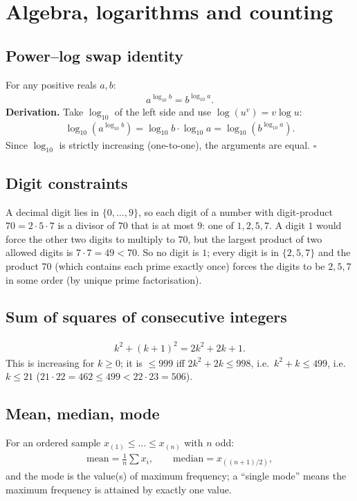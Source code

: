 

\section{Algebra, logarithms and counting}

\subsection{Power--log swap identity}
For any positive reals $a,b$:
\begin{align}
a^{\log_{10}b}=b^{\log_{10}a}. \label{eq:powlog}
\end{align}
\textbf{Derivation.} Take $\log_{10}$ of the left side and use $\log(u^v)=v\log u$:
\begin{align}
\log_{10}\!\left(a^{\log_{10}b}\right)=\log_{10}b\cdot\log_{10}a=\log_{10}\!\left(b^{\log_{10}a}\right).
\end{align}
Since $\log_{10}$ is strictly increasing (one-to-one), the arguments are equal. \hfill$\square$

\subsection{Digit constraints}
A decimal digit lies in $\{0,\dots,9\}$, so each digit of a number with digit-product $70=2\cdot5\cdot7$ is a divisor of $70$
that is at most $9$: one of $1,2,5,7$. A digit $1$ would force the other two digits to multiply to $70$, but the
largest product of two allowed digits is $7\cdot7=49<70$. So no digit is $1$; every digit is in $\{2,5,7\}$ and the
product $70$ (which contains each prime exactly once) forces the digits to be $2,5,7$ in some order
(by unique prime factorisation).

\subsection{Sum of squares of consecutive integers}
\begin{align}
k^2+(k+1)^2=2k^2+2k+1. \label{eq:consecsq}
\end{align}
This is increasing for $k\ge0$; it is $\le999$ iff $2k^2+2k\le998$, i.e.\ $k^2+k\le499$, i.e.\ $k\le21$
($21\cdot22=462\le499<22\cdot23=506$).

\subsection{Mean, median, mode}
For an ordered sample $x_{(1)}\le\dots\le x_{(n)}$ with $n$ odd:
\begin{align}
\text{mean}=\frac1n\sum x_i,\qquad \text{median}=x_{((n+1)/2)}, \label{eq:meanmedian}
\end{align}
and the mode is the value(s) of maximum frequency; a ``single mode'' means the maximum frequency
is attained by exactly one value.

